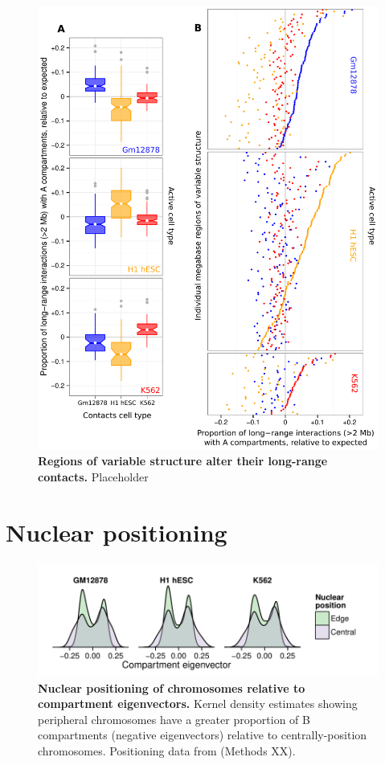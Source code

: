 \documentclass[a4paper,10pt,oneside]{book}
\begin{document}
\begin{figure}
\begin{center} 
\includegraphics[width=.9\textwidth]{figs/longrange.pdf}
\captionsetup{width=\textwidth} 
\caption{ {\bf Regions of variable structure alter their long-range contacts. }
Placeholder
}\label{fig:longrange}
\end{center} 
\end{figure} 


\section{Nuclear positioning}

\begin{figure}
\begin{center} 
\includegraphics[width=\textwidth]{figs/nucpos.pdf}
\captionsetup{width=\textwidth} 
\caption{ {\bf Nuclear positioning of chromosomes relative to compartment eigenvectors. }
Kernel density estimates showing peripheral chromosomes have a greater proportion of B compartments (negative eigenvectors) relative to centrally-position chromosomes. Positioning data from \citet{Boyle2001} (Methods XX).
}\label{fig:nucpos}
\end{center} 
\end{figure} 


\ifstandalone
\begin{small}

\end{small}
\fi
\end{document}
